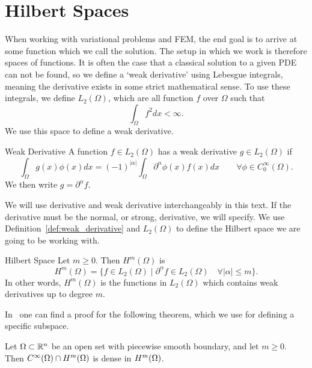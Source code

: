 \section{Hilbert Spaces}
When working with variational problems and FEM,
 the end goal is to arrive at some function which we call the solution.
The setup in which we work is therefore spaces of functions. 
It is often the case that a classical solution to a given PDE can 
not be found, 
so we define a `weak derivative' using Lebesgue integrals, meaning 
the derivative exists in some strict mathematical sense. 
To use these integrals, we define $L_2(\Omega)$, which are all 
function $f$ over $\Omega$ such that 
\begin{equation*}
   \int_\Omega f^2 dx < \infty. 
\end{equation*}
We use this space to define a weak derivative.
\begin{defn}{Weak Derivative}
    A function $f \in L_2(\Omega)$ has a weak derivative $g \in L_2(\Omega)$
    if
    \begin{equation*}
        \int_\Omega g(x)\phi(x) dx = {(-1)}^{|\alpha|}\int_\Omega 
        \partial ^{\alpha}\phi(x) f(x) dx
        \quad\quad \forall \phi \in C^\infty_0(\Omega).
    \end{equation*}
    We then write $g=\partial ^{\alpha}f$.\label{def:weak_derivative}
\end{defn}
We will use derivative and weak derivative interchangeably in this 
text.
If the derivative must be the normal, or strong, derivative, we will 
specify. 
We use Definition~\ref*{def:weak_derivative} and $L_2(\Omega)$ to 
define the Hilbert space we are going to be working with. 
\begin{defn}{Hilbert Space}
   Let $m \geq 0$. Then $H^m(\Omega)$ is 
   \begin{equation*}
    H^m(\Omega) = \{  f \in L_2(\Omega) \mid \partial ^{\alpha}f \in 
    L_2(\Omega) \quad \forall |\alpha| \leq m  \}.
   \end{equation*}
   In other words, $H^m(\Omega)$ is the functions in $L_2(\Omega)$ 
   which contains weak derivatives up to degree $m$.
\end{defn}
In~\cite{Brezis} one can find a proof for the following theorem, which 
we use for defining a specific subspace.
\begin{thmx}{\quad}
   Let $\Omega \subset \mathbb{R}^n$ be an open set with piecewise smooth boundary, 
   and let $m \geq 0$. Then $C^\infty (\Omega) \cap H^m(\Omega)$ is dense in 
   $H^m(\Omega)$.\label{thm:c_dense_in_h}
\end{thmx}
